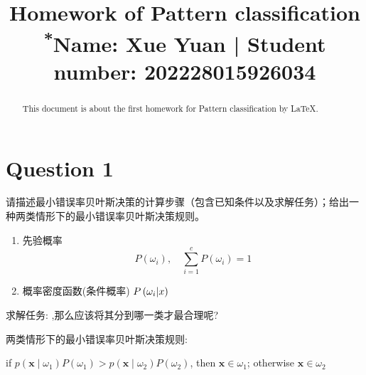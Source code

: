 \documentclass[homework]{IEEEtran}
\begin{document}
\title{Homework of Pattern classification\\
{\footnotesize \textsuperscript{*}Name: Xue Yuan  | Student number: 202228015926034}
}

\author{}
\maketitle

\begin{abstract}
This document is about the first homework for Pattern classification by \LaTeX.
\end{abstract}

\section{Question 1}
\begin{CJK}{UTF8}{gkai}
    请描述最小错误率贝叶斯决策的计算步骤（包含已知条件以及求解任务）；给出一种两类情形下的最小错误率贝叶斯决策规则。\par
    \begin{enumerate}[已知条件:]
		\item 先验概率  $$ P\left(\omega_i\right), \quad \sum_{i=1}^c P\left(\omega_i\right)=1 $$
		\item 概率密度函数(条件概率) $P\left(\omega_i\vert\\x\right)$
    	\end{enumerate}\par
    求解任务: ,那么应该将其分到哪一类才最合理呢?\par
    两类情形下的最小错误率贝叶斯决策规则:\par
        if $p\left(\mathbf{x} \mid \omega_1\right) P\left(\omega_1\right)>p\left(\mathbf{x} \mid \omega_2\right) P\left(\omega_2\right)$, then $\mathbf{x} \in \omega_1$; otherwise $\mathbf{x} \in \omega_2$
\end{CJK}
\end{document}
